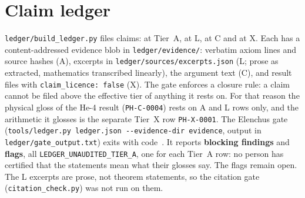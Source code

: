 \documentclass[11pt]{article}
\theoremstyle{remark}
\begin{document}
\section{Claim ledger}\label{sec:ledger}
\texttt{ledger/build\_ledger.py} files \PLedN{} claims: \PLedA{} at Tier~A, \PLedL{} at L, \PLedC{} at C and \PLedX{} at X. Each has a content-addressed evidence blob in \texttt{ledger/evidence/}: verbatim axiom lines and source hashes (A), excerpts in \texttt{ledger/sources/excerpts.json} (L; prose as extracted, mathematics transcribed linearly), the argument text (C), and result files with \texttt{claim\_licence: false} (X).
The gate enforces a closure rule: a claim cannot be filed above the effective tier of anything it rests on. For that reason the physical gloss of the He-4 result (\texttt{PH-C-0004}) rests on A and L rows only, and the arithmetic it glosses is the separate Tier~X row \texttt{PH-X-0001}. The Elenchus gate
(\texttt{tools/ledger.py ledger.json -{}-evidence-dir evidence}, output in \texttt{ledger/gate\_output.txt}) exits with code~\PGateExit. It reports \textbf{\PGateBlock{} blocking findings} and \textbf{\PGateFlag{} flags}, all \texttt{LEDGER\_UNAUDITED\_TIER\_A}, one for each Tier~A row: no person has certified that the statements mean what their glosses say. The flags remain open.
The L excerpts are prose, not theorem statements, so the citation gate (\texttt{citation\_check.py}) was not run on them.

\end{document}
